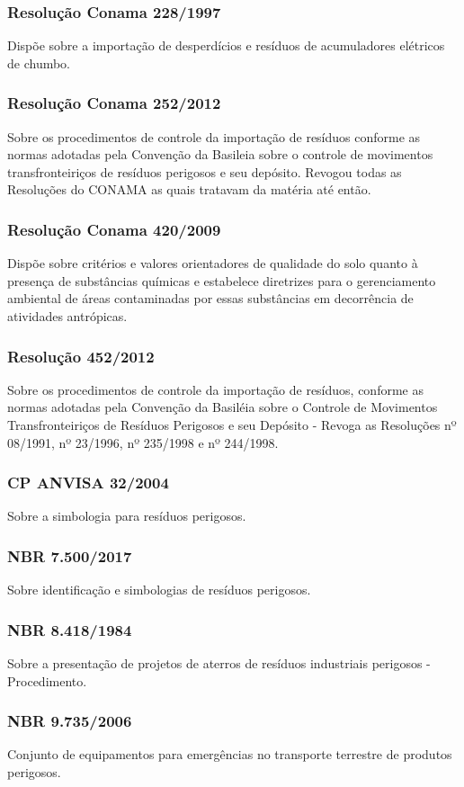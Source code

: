\begin{subapend}
\begin{subsubapend}
		\subsubsection{Resolução Conama 228/1997}
		Dispõe sobre a importação de desperdícios e resíduos de acumuladores elétricos de chumbo.
		\subsubsection{Resolução Conama 252/2012}
		Sobre os procedimentos de controle da importação de resíduos conforme as normas adotadas pela Convenção da Basileia sobre o controle de movimentos transfronteiriços de resíduos perigosos e seu depósito. Revogou todas as Resoluções do CONAMA as quais tratavam da matéria até então.
		\subsubsection{Resolução Conama 420/2009}
		Dispõe sobre critérios e valores orientadores de qualidade do solo quanto à presença de substâncias químicas e estabelece diretrizes para o gerenciamento ambiental de áreas contaminadas por essas substâncias em decorrência de atividades antrópicas.
		\subsubsection{Resolução 452/2012}
		Sobre os procedimentos de controle da importação de resíduos, conforme as normas adotadas pela Convenção da Basiléia sobre o Controle de Movimentos Transfronteiriços de Resíduos Perigosos e seu Depósito - Revoga as Resoluções nº 08/1991, nº 23/1996, nº 235/1998 e nº 244/1998.
		\subsubsection{CP ANVISA 32/2004}
		Sobre a simbologia para resíduos perigosos.
		\subsubsection{NBR 7.500/2017}
		Sobre identificação e simbologias de resíduos perigosos.
		\subsubsection{NBR 8.418/1984}
		Sobre a presentação de projetos de aterros de resíduos industriais perigosos - Procedimento.
		\subsubsection{NBR 9.735/2006}
		Conjunto de equipamentos para emergências no transporte terrestre de produtos perigosos.

\end{subsubapend}
\end{subapend}
